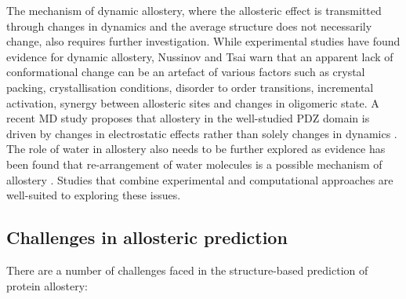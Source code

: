 The mechanism of dynamic allostery, where the allosteric effect is transmitted through changes in dynamics and the average structure does not necessarily change, also requires further investigation.
While experimental studies \cite{Popovych2006, Capdevila2017, Wellington2017} have found evidence for dynamic allostery, Nussinov and Tsai \cite{Nussinov2015} warn that an apparent lack of conformational change can be an artefact of various factors such as crystal packing, crystallisation conditions, disorder to order transitions, incremental activation, synergy between allosteric sites and changes in oligomeric state.
A recent MD study proposes that allostery in the well-studied PDZ domain is driven by changes in electrostatic effects rather than solely changes in dynamics \cite{Kumawat2017, Liu2017}.
The role of water in allostery also needs to be further explored as evidence has been found that re-arrangement of water molecules is a possible mechanism of allostery \cite{Buchli2013, Amor2016}.
Studies that combine experimental and computational approaches \cite{Haselbach2017, Ozorowski2017} are well-suited to exploring these issues.


\subsection{Challenges in allosteric prediction}

There are a number of challenges faced in the structure-based prediction of protein allostery:

